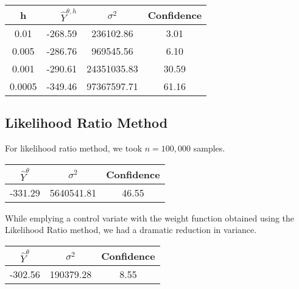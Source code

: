 \begin{longtable}[]{@{}crcc@{}}
\toprule
h & \(\hat Y^{\theta, h}\) & \(\sigma^2\) & Confidence\tabularnewline
\midrule
\endhead
0.01 & -268.59 & 236102.86 & 3.01\tabularnewline
0.005 & -286.76 & 969545.56 & 6.10\tabularnewline
0.001 & -290.61 & 24351035.83 & 30.59\tabularnewline
0.0005 & -349.46 & 97367597.71 & 61.16\tabularnewline
\bottomrule
\end{longtable}

\subsection{Likelihood Ratio Method}\label{likelihood-ratio-method}

For likelihood ratio method, we took \(n = 100,000\) samples.

\begin{longtable}[]{@{}ccc@{}}
\toprule
\(\hat Y^{\theta}\) & \(\sigma^2\) & Confidence\tabularnewline
\midrule
\endhead
-331.29 & 5640541.81 & 46.55\tabularnewline
\bottomrule
\end{longtable}

While emplying a control variate with the weight function obtained using
the Likelihood Ratio method, we had a dramatic reduction in variance.

\begin{longtable}[]{@{}ccc@{}}
\toprule
\(\hat Y^\theta\) & \(\sigma^2\) & Confidence\tabularnewline
\midrule
\endhead
-302.56 & 190379.28 & 8.55\tabularnewline
\bottomrule
\end{longtable}
